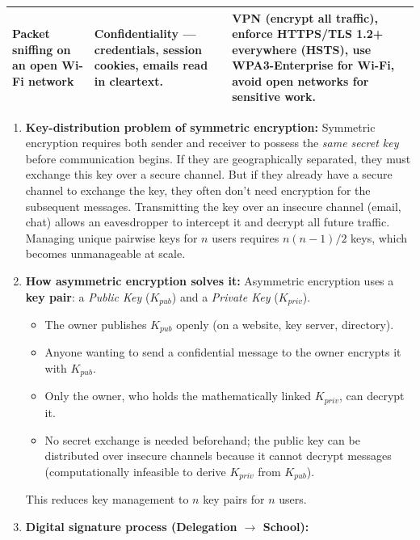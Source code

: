 \documentclass[11pt]{article}
\newcommand{\cle}[1]{{\popxbold\color{popdark}#1}}
\begin{document}
\begin{corrige}
\begin{center}
\begin{tabularx}{\linewidth}{|l|X|X|}
\hline
Packet sniffing on an open Wi-Fi network & \textbf{Confidentiality} — credentials, session cookies, emails read in cleartext. & \textbf{VPN} (encrypt all traffic), enforce \textbf{HTTPS/TLS 1.2+} everywhere (HSTS), use \textbf{WPA3-Enterprise} for Wi-Fi, avoid open networks for sensitive work. \\
\hline
\end{tabularx}
\end{center}
\end{corrige}

\begin{corrige}
\begin{enumerate}
\item \textbf{Key-distribution problem of symmetric encryption:} \cle{Symmetric encryption} requires both sender and receiver to possess the \emph{same secret key} before communication begins. If they are geographically separated, they must exchange this key over a secure channel. But if they already have a secure channel to exchange the key, they often don't need encryption for the subsequent messages. Transmitting the key over an insecure channel (email, chat) allows an eavesdropper to intercept it and decrypt all future traffic. Managing unique pairwise keys for $n$ users requires $n(n-1)/2$ keys, which becomes unmanageable at scale.
\item \textbf{How asymmetric encryption solves it:} \cle{Asymmetric encryption} uses a \textbf{key pair}: a \emph{Public Key} ($K_{pub}$) and a \emph{Private Key} ($K_{priv}$).
\begin{itemize}
\item The owner publishes $K_{pub}$ openly (on a website, key server, directory).
\item Anyone wanting to send a confidential message to the owner encrypts it with $K_{pub}$.
\item Only the owner, who holds the mathematically linked $K_{priv}$, can decrypt it.
\item No secret exchange is needed beforehand; the public key can be distributed over insecure channels because it cannot decrypt messages (computationally infeasible to derive $K_{priv}$ from $K_{pub}$).
\end{itemize}
This reduces key management to $n$ key pairs for $n$ users.
\item \textbf{Digital signature process (Delegation $\to$ School):}
\begin{enumerate}

\end{enumerate}
\end{enumerate}
\end{corrige}
\end{document}
